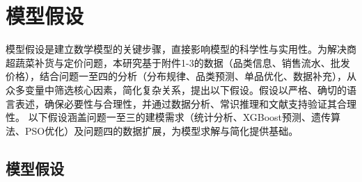 \documentclass{cumcmthesis} %
\begin{document}
\section{模型假设}

模型假设是建立数学模型的关键步骤，直接影响模型的科学性与实用性。为解决商超蔬菜补货与定价问题，本研究基于附件1-3的数据（品类信息、销售流水、批发价格），结合问题一至四的分析（分布规律、品类预测、单品优化、数据补充），从众多变量中筛选核心因素，简化复杂关系，提出以下假设。假设以严格、确切的语言表述，确保必要性与合理性，并通过数据分析、常识推理和文献支持验证其合理性\cite{gustafsson2006retailing}。 以下假设涵盖问题一至三的建模需求（统计分析、XGBoost预测、遗传算法、PSO优化）及问题四的数据扩展，为模型求解与简化提供基础。

\subsection{模型假设}
\end{document}
